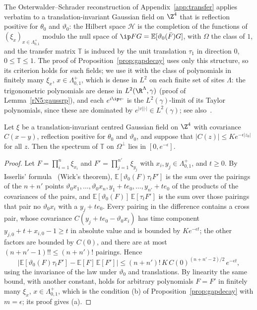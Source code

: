 The Osterwalder--Schrader reconstruction of Appendix~\ref{app:transfer}
applies verbatim to a translation-invariant Gaussian field on $\Z^4$ that is
reflection positive for $\theta_0$ and $\vartheta_0$: the Hilbert space $\mathcal H$ is the
completion of the functions of $(\xi_x)_{x\in\Lambda^+_{0,1}}$ modulo the null
space of $\ip FG=\mathbb E[\vartheta_0(\bar F)G]$, with $\Omega$ the class of
$1$, and the transfer matrix $\mathbb T$ is induced by the unit translation
$\tau_1$ in direction $0$, $0\le\mathbb T\le1$. The proof of
Proposition~\ref{prop:gapdecay} uses only this structure, so its criterion
holds for such fields; we use it with the class of polynomials in finitely
many $\xi_x$, $x\in\Lambda^+_{0,1}$, which is dense in $L^2$ on each finite
set of sites $\Lambda$: the trigonometric polynomials are dense in
$L^2(\R^\Lambda,\gamma)$ (proof of Lemma~\ref{rN5:gaussrp}), and each $e^{i
\ip v\cdot}$ is the $L^2(\gamma)$-limit of its Taylor polynomials, since these
are dominated by $e^{|v||\cdot|}\in L^2(\gamma)$; see also~\cite{Jan97}.

\begin{lemma}\label{rN5:gaussgap}
Let $\xi$ be a translation-invariant centred Gaussian field on $\Z^4$ with
covariance $C(x-y)$, reflection positive for $\theta_0$ and $\vartheta_0$,
and suppose that
$|C(z)|\le Ke^{-\epsilon|z_0|}$ for all $z$. Then the spectrum of $\mathbb
T$ on $\Omega^\perp$ lies in $[0,e^{-\epsilon}]$.
\end{lemma}

\begin{proof}
Let $F=\prod_{i=1}^n\xi_{x_i}$ and $F'=\prod_{j=1}^{n'}\xi_{y_j}$ with
$x_i,y_j\in\Lambda^+_{0,1}$, and $t\ge0$. By Isserlis' formula~\cite{Iss18}
(Wick's theorem), $\mathbb E[\vartheta_0(F)\tau_tF']$ is the sum over the
pairings of the $n+n'$ points $\vartheta_0x_1,\dots,\vartheta_0x_n,y_1+te_0,
\dots,y_{n'}+te_0$ of the products of the covariances of the pairs, and
$\mathbb E[\vartheta_0(F)]\,\mathbb E[\tau_tF']$ is the sum over those pairings
that pair no $\vartheta_0x_i$ with a $y_j+te_0$. Every pairing in the
difference contains a cross pair, whose covariance $C(y_j+te_0-\vartheta_0x_i)$
has time component $y_{j,0}+t+x_{i,0}-1\ge t$ in absolute value and is bounded
by $Ke^{-\epsilon t}$; the other factors are bounded by $C(0)$, and there
are at most $(n+n'-1)!!\le(n+n')!$ pairings. Hence
\[
\bigl|\mathbb E[\vartheta_0(F)\tau_tF']-\mathbb E[F]\,\mathbb E[F']\bigr|\le
(n+n')!\,K\,C(0)^{(n+n'-2)/2}\,e^{-\epsilon t},
\]
using the invariance of the law under $\vartheta_0$ and translations. By
linearity the same bound, with another constant, holds for arbitrary
polynomials $F=F'$ in finitely many $\xi_x$, $x\in\Lambda^+_{0,1}$, which is
the condition (b) of Proposition~\ref{prop:gapdecay} with $m=\epsilon$; its
proof gives (a).
\end{proof}
